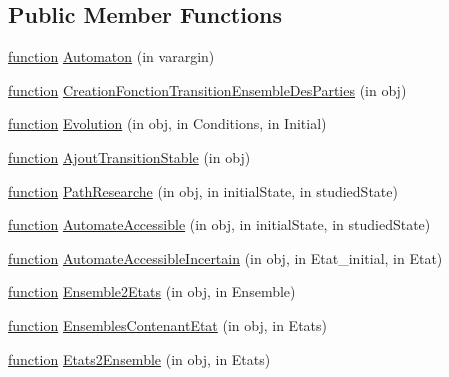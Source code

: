 \subsection*{Public Member Functions}
\begin{DoxyCompactItemize}
\item 
\hyperlink{_plan__desuma_functions_8m_ac2ffb26d6f42d3bbcd7847b0873403f4}{function} \hyperlink{class_automaton_a15c7a46aa4fae3aa3d810b530f3a8311}{Automaton} (in varargin)
\item 
\hyperlink{_plan__desuma_functions_8m_ac2ffb26d6f42d3bbcd7847b0873403f4}{function} \hyperlink{class_automaton_a4f83090137c23494ed5545f0238c06e5}{Creation\+Fonction\+Transition\+Ensemble\+Des\+Parties} (in obj)
\item 
\hyperlink{_plan__desuma_functions_8m_ac2ffb26d6f42d3bbcd7847b0873403f4}{function} \hyperlink{class_automaton_a8c68fee79107192dd9a4b7485766030e}{Evolution} (in obj, in Conditions, in Initial)
\item 
\hyperlink{_plan__desuma_functions_8m_ac2ffb26d6f42d3bbcd7847b0873403f4}{function} \hyperlink{class_automaton_aa987a80ff4dde5c085a21feb64d64d2e}{Ajout\+Transition\+Stable} (in obj)
\item 
\hyperlink{_plan__desuma_functions_8m_ac2ffb26d6f42d3bbcd7847b0873403f4}{function} \hyperlink{class_automaton_aa213172c8c114955cf1890a86a7cdd48}{Path\+Researche} (in obj, in initial\+State, in studied\+State)
\item 
\hyperlink{_plan__desuma_functions_8m_ac2ffb26d6f42d3bbcd7847b0873403f4}{function} \hyperlink{class_automaton_a8613ae6ec0dc5bde354258f7a4609517}{Automate\+Accessible} (in obj, in initial\+State, in studied\+State)
\item 
\hyperlink{_plan__desuma_functions_8m_ac2ffb26d6f42d3bbcd7847b0873403f4}{function} \hyperlink{class_automaton_ae93818a17bddca4b479c969caeb62b83}{Automate\+Accessible\+Incertain} (in obj, in Etat\+\_\+initial, in Etat)
\item 
\hyperlink{_plan__desuma_functions_8m_ac2ffb26d6f42d3bbcd7847b0873403f4}{function} \hyperlink{class_automaton_a35b222e5fa78c123b1d43bee19ca1064}{Ensemble2\+Etats} (in obj, in Ensemble)
\item 
\hyperlink{_plan__desuma_functions_8m_ac2ffb26d6f42d3bbcd7847b0873403f4}{function} \hyperlink{class_automaton_ad4e79b3f12249b02d4eba9263c657451}{Ensembles\+Contenant\+Etat} (in obj, in Etats)
\item 
\hyperlink{_plan__desuma_functions_8m_ac2ffb26d6f42d3bbcd7847b0873403f4}{function} \hyperlink{class_automaton_a41ce61d265f98a15142501564ec11d99}{Etats2\+Ensemble} (in obj, in Etats)
\end{DoxyCompactItemize}
